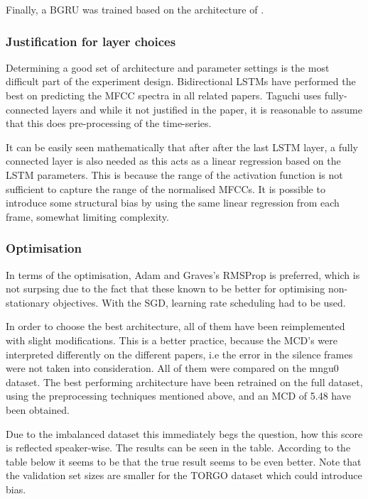 \documentclass[a4paper]{article}
\begin{document}
Finally, a BGRU was trained based on the architecture of \cite{Gonzalez2017}.

\subsubsection{Justification for layer choices}
Determining a good set of architecture and parameter settings is the most difficult part of
the experiment design. Bidirectional LSTMs have performed the best on predicting the MFCC spectra in
all related papers. Taguchi uses fully-connected layers and while it not justified in the paper, it
is reasonable to assume that this does pre-processing of the time-series. 

It can be easily seen mathematically that after after the last LSTM layer, a fully connected layer is also needed as this acts as a linear regression based on the LSTM parameters. This is because the range of the activation function is not sufficient to capture the range of the normalised MFCCs. It is possible to introduce some structural bias by using the same linear regression from each frame, somewhat limiting complexity. 

\subsubsection{Optimisation}
In terms of the optimisation, Adam \cite{Kingma2015} and Graves's RMSProp is preferred, which is not surpsing due to the
fact that these known to be better for optimising non-stationary objectives. With the SGD,
learning rate scheduling had to be used. 

In order to choose the best architecture, all of them have been reimplemented with slight modifications.
This is a better practice, because the MCD's were interpreted differently on the different papers, i.e the error in the silence frames were not taken into consideration. All of them were compared on the mngu0 dataset.
The best performing architecture have been retrained on the full dataset, using the preprocessing techniques mentioned above, and an MCD of 5.48 have been obtained.

Due to the imbalanced dataset this immediately begs the question, how this score is reflected speaker-wise. The results can be seen in the table. According to the table below it seems to be that the true result seems to be even better. Note that the validation set sizes are smaller for the TORGO dataset which could introduce bias.
\end{document}
